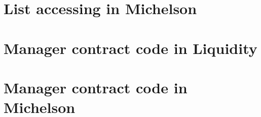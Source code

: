 \chapter{List accessing in Michelson}\label{apx:nth}


				 


\chapter{Manager contract code in Liquidity}\label{apx:manager_liq}


\chapter{Manager contract code in Michelson}\label{apx:manager_michelson}

				 

				 
